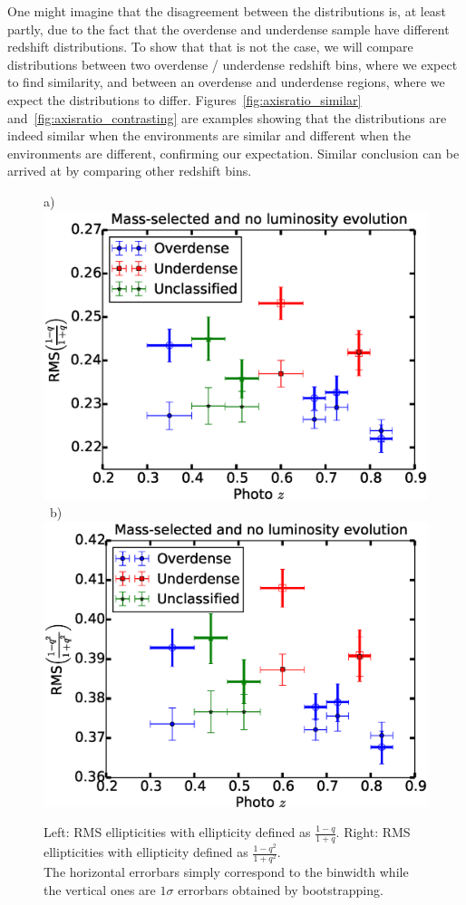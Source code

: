 \documentclass[twocolumn,useAMS,usenatbib]{mn2e}
\begin{document}
One might imagine that the disagreement between the distributions is, at least partly, due to the fact that the overdense and underdense sample have different redshift distributions.
To show that that is not the case, we will compare distributions between two overdense / underdense redshift bins, where we expect to find similarity, and between an overdense and underdense regions,
where we expect the distributions to differ.
Figures~\ref{fig:axisratio_similar} and~\ref{fig:axisratio_contrasting} are examples showing that the distributions are indeed similar when the environments are similar and different when the environments are different, confirming our expectation.
Similar conclusion can be arrived at by comparing other redshift bins.


\begin{figure}
 a) \includegraphics[width=1.0\columnwidth]{rms_ellip1_noevolution.eps} \
 b) \includegraphics[width=1.0\columnwidth]{rms_ellip2_noevolution.eps} \\
 \caption{Left: RMS ellipticities with ellipticity defined as $\frac{1-q}{1+q}$. \; 
          Right: RMS ellipticities with ellipticity defined as $\frac{1-q^2}{1+q^2}$.\\ The horizontal errorbars simply correspond to the binwidth while the vertical ones
          are $1\sigma$ errorbars obtained by bootstrapping.}
 \label{fig:rms_ellip}
\end{figure}
\end{document}
